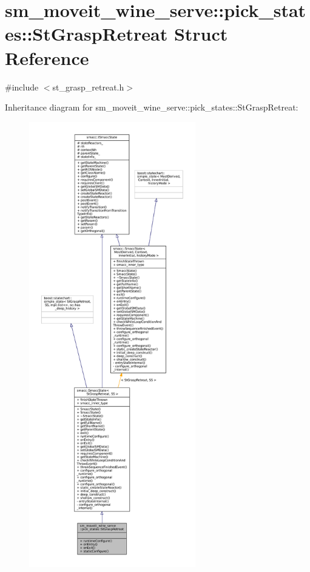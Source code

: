 \hypertarget{structsm__moveit__wine__serve_1_1pick__states_1_1StGraspRetreat}{}\section{sm\+\_\+moveit\+\_\+wine\+\_\+serve\+:\+:pick\+\_\+states\+:\+:St\+Grasp\+Retreat Struct Reference}
\label{structsm__moveit__wine__serve_1_1pick__states_1_1StGraspRetreat}


{\ttfamily \#include $<$st\+\_\+grasp\+\_\+retreat.\+h$>$}



Inheritance diagram for sm\+\_\+moveit\+\_\+wine\+\_\+serve\+:\+:pick\+\_\+states\+:\+:St\+Grasp\+Retreat\+:
\nopagebreak
\begin{figure}[H]
\begin{center}
\leavevmode
\includegraphics[height=550pt]{structsm__moveit__wine__serve_1_1pick__states_1_1StGraspRetreat__inherit__graph}
\end{center}
\end{figure}


